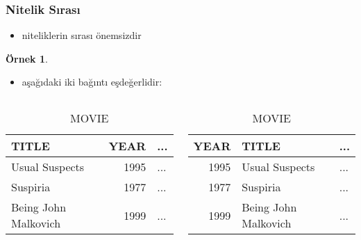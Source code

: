 \documentclass[dvipsnames]{beamer}
\theoremstyle{definition}
\theoremstyle{example}
\newtheorem{ornek}[theorem]{Örnek}
\theoremstyle{plain}
\begin{document}
\begin{frame}
  \frametitle{Nitelik Sırası}

  \begin{itemize}
    \item niteliklerin sırası önemsizdir
  \end{itemize}

  \pause
  \begin{ornek}
    \begin{itemize}
      \item aşağıdaki iki bağıntı eşdeğerlidir:
    \end{itemize}

    \begin{columns}
      \begin{tiny}
      \begin{table}
        \caption{MOVIE}
        \begin{tabular}{|l|r|l|}\hline
TITLE                & YEAR & ...\\\hline\hline
Usual Suspects       & 1995 & ...\\\hline
Suspiria             & 1977 & ...\\\hline
Being John Malkovich & 1999 & ...\\\hline
        \end{tabular}
      \end{table}
      \end{tiny}

      \begin{tiny}
      \begin{table}
        \caption{MOVIE}
        \begin{tabular}{|r|l|l|}\hline
YEAR & TITLE                & ...\\\hline\hline
1995 & Usual Suspects       & ...\\\hline
1977 & Suspiria             & ...\\\hline
1999 & Being John Malkovich & ...\\\hline
        \end{tabular}
      \end{table}
      \end{tiny}
    \end{columns}
  \end{ornek}
\end{frame}
\end{document}
